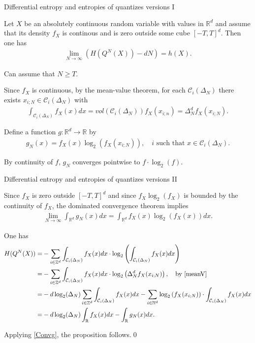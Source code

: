 \begin{frame}{Differential entropy and entropies of quantizes versions I}
\begin{proposition}
Let $X$ be an absolutely continuous random variable with values in $\mathbb{R}^d$ and assume that its density $f_X$ is continous and 
is zero outside some cube $[-T,T]^d$. Then one has 
\begin{align}\label{EqDiffEntr}
\lim_{N\to \infty}\left(H(Q^N(X))-dN\right)=h(X). 
\end{align}
\end{proposition}
\small
{}
\vspace{-0.2cm}
\bit 
\item Can assume that $N\geq T$. 
\item Since $f_X$ is continuous, by the mean-value theorem, for each $\mathcal{C}_i(\Delta_N)$ there exists $x_{i;N}\in\mathcal{C}_i(\Delta_N)$ with 
\begin{align}\label{meanV}
\int_{\mathcal{C}_i(\Delta_N)}f_X(x)dx=vol(\mathcal{C}_i(\Delta_N))f_X(x_{i;n})=\Delta_N^df_X(x_{i;N}).
\end{align}
\item Define a function $g:\mathbb{R}^d\to\mathbb{R}$ by
\begin{align*}
g_N(x)=f_X(x)\log_{2}(f_X(x_{i;N})), \quad\text{$i$ such that  $x\in\mathcal{C}_i(\Delta_N)$}. 
\end{align*}
\item By continuity of $f$, $g_N$ converges pointwise to $f\cdot\log_2(f)$.
\eit
\end{frame}

\begin{frame}{Differential entropy and entropies of quantizes versions II}
\small
\bit
\item Since $f_X$ is zero outside $[-T,T]^d$ and since $f_X\log_2(f_X)$ is bounded by the continuity of $f_X$, the dominated convergence theorem implies
\begin{align}\label{Convg}
\lim_{N\to\infty}\int_{\mathbb{R}^d}g_N(x)dx=\int_{\mathbb{R}^d}f_X(x)\log_2(f_X(x))dx. 
\end{align}
\item One has
\begin{align*}
H(Q^N(X))
=&-\sum_{i\in\mathbb{Z}^d}\int_{\mathcal{C}_i(\Delta_N)}f_X(x)dx\cdot\log_2\left(\int_{\mathcal{C}_i(\Delta_N)}f_X(x)dx\right)\\
=&-\sum_{i\in\mathbb{Z}^d}\int_{\mathcal{C}_i(\Delta_N)}f_X(x)dx\cdot\log_2\left(\Delta_N^df_X(x_{i;N})\right),\quad\text{by \eqref{meanV}}\\
=&-d\log_2(\Delta_N)\sum_{i\in\mathbb{Z}^d}\int_{\mathcal{C}_i(\Delta_N)}f_X(x)dx-\sum_{i\in\mathbb{N}^d}\log_2\left(f_X(x_{i;N})\right)\cdot \int_{\mathcal{C}_i(\Delta_N)}f_X(x)dx\\
=&-d\log_2(\Delta_N)\int_{\mathbb{R}}f_X(x)dx-\int_{\mathbb{R}}g_N(x)dx. 
\end{align*}
\item
Applying \eqref{Convg}, the proposition follows.\qed
\eit
\end{frame}

